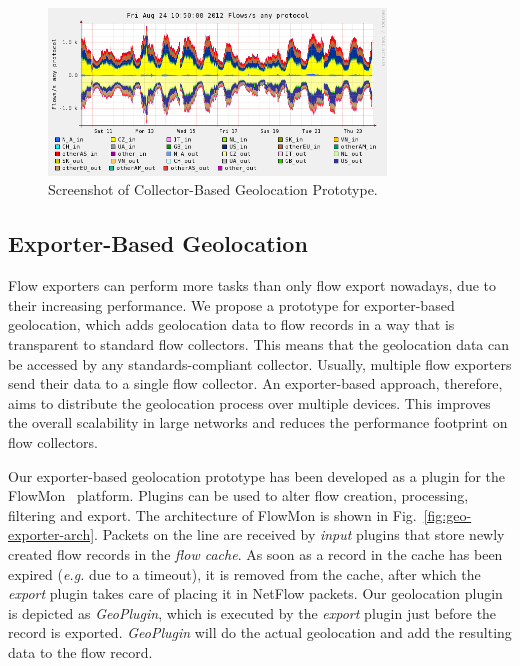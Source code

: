 \begin{figure}[!tb]
    \centering
    \includegraphics[width=0.8\textwidth]{figures/paper-geolocation/nfgeodump.png}
    \caption{Screenshot of Collector-Based Geolocation Prototype.}
    \label{fig:geo-nfgeodump_screenshot}
\end{figure}

\subsection{Exporter-Based Geolocation} \label{subsec:geo-exporter_based_geolocation}

Flow exporters can perform more tasks than only flow export nowadays, due to their increasing performance. We propose a prototype for exporter-based geolocation, which adds geolocation data to flow records in a way that is transparent to standard flow collectors. This means that the geolocation data can be accessed by any standards-compliant collector. Usually, multiple flow exporters send their data to a single flow collector. An exporter-based approach, therefore, aims to distribute the geolocation process over multiple devices. This improves the overall scalability in large networks and reduces the performance footprint on flow collectors.

Our exporter-based geolocation prototype has been developed as a plugin for the FlowMon~\cite{FlowmonNetworks--Flowmon} platform. Plugins can be used to alter flow creation, processing, filtering and export. The architecture of FlowMon is shown in Fig.~\ref{fig:geo-exporter-arch}. Packets on the line are received by \textit{input} plugins that store newly created flow records in the \textit{flow cache}. As soon as a record in the cache has been expired (\textit{e.g.} due to a timeout), it is removed from the cache, after which the \textit{export} plugin takes care of placing it in NetFlow packets. Our geolocation plugin is depicted as \textit{GeoPlugin}, which is executed by the \textit{export} plugin just before the record is exported. \textit{GeoPlugin} will do the actual geolocation and add the resulting data to the flow record.

